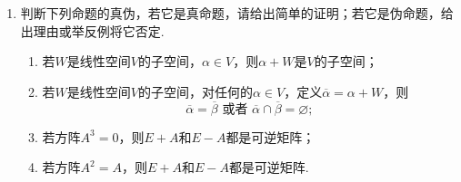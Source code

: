 \begin{enumerate}
    \item 判断下列命题的真伪，若它是真命题，请给出简单的证明；若它是伪命题，给出理由或举反例将它否定.
    \begin{enumerate}
        \item 若$W$是线性空间$V$的子空间，$\alpha\in V$，则$\alpha+W$是$V$的子空间；

        \item 若$W$是线性空间$V$的子空间，对任何的$\alpha\in V$，定义$\overline{\alpha}=\alpha+W$，则
        \[\overline{\alpha}=\overline{\beta}\text{~或者~}\overline{\alpha}\cap\overline{\beta}=\varnothing;\]

        \item 若方阵$A^3=0$，则$E+A$和$E-A$都是可逆矩阵；

        \item 若方阵$A^2=A$，则$E+A$和$E-A$都是可逆矩阵.
    \end{enumerate}
\end{enumerate}

\clearpage
